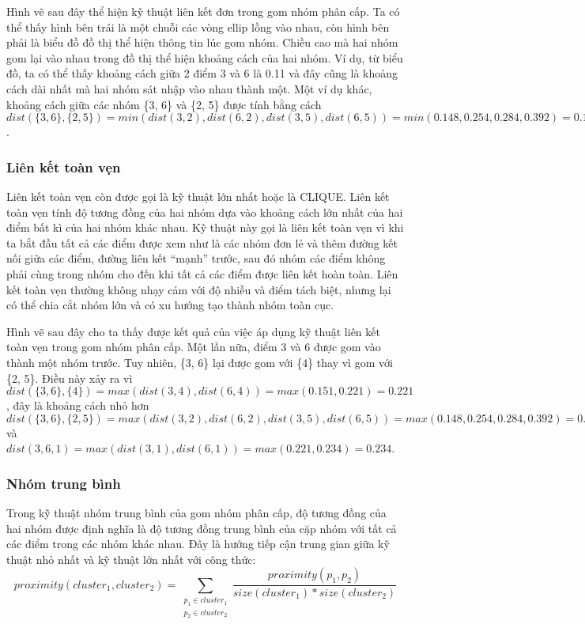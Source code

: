 Hình vẽ sau đây thể hiện kỹ thuật liên kết đơn trong gom nhóm phân cấp.
Ta có thể thấy hình bên trái là một chuỗi các vòng ellip lồng vào nhau, còn hình bên phải là biểu đồ đồ thị thể hiện thông tin lúc gom nhóm.
Chiều cao mà hai nhóm gom lại vào nhau trong đồ thị thể hiện khoảng cách của hai nhóm.
Ví dụ, từ biểu đồ, ta có thể thấy khoảng cách giữa 2 điểm 3 và 6 là 0.11 và đây cũng là khoảng cách dài nhất mà hai nhóm sát nhập vào nhau thành một. 
Một ví dụ khác, khoảng cách giữa các nhóm \{3, 6\} và \{2, 5\} được tính  bằng cách $dist(\{3, 6\}, \{2, 5\}) = min(dist(3,2),dist(6, 2), dist(3, 5), dist(6, 5)) = min (0.148, 0.254, 0.284, 0.392) = 0.148$.


\subsubsection{Liên kết toàn vẹn}		
Liên kết toàn vẹn còn được gọi là kỹ thuật lớn nhất hoặc là CLIQUE.
Liên kết toàn vẹn tính độ tương đồng của hai nhóm dựa vào khoảng cách lớn nhất của hai điểm bất kì của hai nhóm khác nhau.
Kỹ thuật này gọi là liên kết toàn vẹn vì khi ta bắt đầu tất cả các điểm được xem như là các nhóm đơn lẻ và thêm đường kết nối giữa các điểm, đường liên kết ``mạnh'' trước, sau đó nhóm các điểm không phải cùng trong nhóm cho đến khi tất cả các điểm được liên kết hoàn toàn.
Liên kết toàn vẹn thường không nhạy cảm với độ nhiễu và điểm tách biệt, nhưng lại có thể chia cắt nhóm lớn và có xu hướng tạo thành nhóm toàn cục.

Hình vẽ sau đây cho ta thấy được kết quả của việc áp dụng kỹ thuật liên kết toàn vẹn trong gom nhóm phân cấp.
Một lần nữa, điểm 3 và 6 được gom vào thành một nhóm trước.
Tuy nhiên, \{3, 6\} lại được gom với \{4\} thay vì gom với \{2, 5\}.
Điều này xảy ra vì $dist(\{3, 6\}, \{4\}) = max(dist(3, 4), dist(6, 4)) = max(0.151, 0.221) = 0.221$, đây là khoảng cách nhỏ hơn $dist(\{3, 6\}, \{2, 5\}) = max(dist(3, 2), dist(6, 2), dist(3, 5), dist(6, 5)) = max(0.148, 0.254, 0.284, 0.392) = 0.392$ và $dist({3, 6}, {1}) = max(dist(3, 1), dist(6, 1)) = max(0.221, 0.234) = 0.234$.


\subsubsection{Nhóm trung bình}
Trong kỹ thuật nhóm trung bình của gom nhóm phân cấp, độ tương đồng của hai nhóm được định nghĩa là độ tương đồng trung bình của cặp nhóm với tất cả các điểm trong các nhóm khác nhau.
Đây là hướng tiếp cận trung gian giữa kỹ thuật nhỏ nhất và kỹ thuật lớn nhất với công thức: 
\begin{equation}
proximity(cluster_1, cluster_2) = \sum_{\substack{p_1 \in cluster_1 \\ p_2 \in cluster_2}} \frac{proximity(p_1, p_2)}{size(cluster_1) * size(cluster_2)}
\end{equation}

